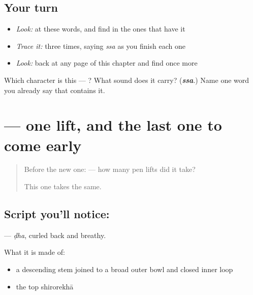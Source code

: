 \subsection*{Your turn}
\begin{itemize}
\raggedright
  \item \emph{Look:} at these words, and find  in the ones that have it
\end{itemize}

\begin{quote}
\end{quote}

\begin{itemize}
\raggedright
  \item \emph{Trace it:}  three times, saying \emph{ssa} as you finish each one
  \item \emph{Look:} back at any page of this chapter and find  once more
\end{itemize}

\begin{tcolorbox}[breakable,colback=teal!4,colframe=teal!35!black,title={Before you move on}]
Which character is this — ? What sound does it carry? (\emph{\textbf{ssa}}.) Name one word you already say that contains it.
\end{tcolorbox}
\section[\texorpdfstring{\hi{ढ} (ḍha)}{ढ (ḍha)}]{ — one lift, and the last one to come early}

\label{lesson:HI-S137-letter-dha-retroflex}



\begin{quote}
Before the new one: \textbf{} — how many pen lifts did it take?

This one takes the same.
\end{quote}

\subsection*{Script you'll notice: }
\textbf{} — \emph{ḍha}, curled back and breathy.

What it is made of:

\begin{itemize}
\raggedright
  \item a descending stem joined to a broad outer bowl and closed inner loop
  \item the top shirorekhā
\end{itemize}

